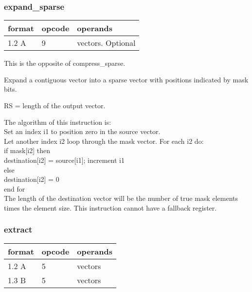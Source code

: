 \documentclass[forwardcom.tex]{subfiles}
\begin{document}
\subsubsection{expand\_sparse}
\label{table:expandSparseInstruction}
\begin{tabular}{|p{12mm}|p{12mm}|p{110mm}|}
\hline
\bfseries format & \bfseries opcode & \bfseries operands \\ \hline
1.2 A & 9 & vectors. Optional \\ \hline
\end{tabular}
\vspace{2mm}

This is the opposite of compress\_sparse.

Expand a contiguous vector into a sparse vector with positions indicated by mask bits. 

RS = length of the output vector.

\vspace{2mm}
The algorithm of this instruction is:\\
Set an index i1 to position zero in the source vector.\\
Let another index i2 loop through the mask vector. For each i2 do:\\
\hspace{4mm} if mask[i2] then\\
\hspace{8mm}   destination[i2] = source[i1]; increment i1\\
\hspace{4mm} else\\
\hspace{8mm}   destination[i2] = 0\\
  end for\\
  
\vspace{2mm}
The length of the destination vector will be the number of true mask elements
times the element size. This instruction cannot have a fallback register.
\vspace{2mm}


\subsubsection{extract}
\label{table:extractInstruction}
\begin{tabular}{|p{12mm}|p{12mm}|p{110mm}|}
\hline
\bfseries format & \bfseries opcode & \bfseries operands \\ \hline
1.2 A &  5 & vectors  \\ \hline
1.3 B &  5 & vectors  \\ \hline
\end{tabular}
\vspace{2mm}
\end{document}
